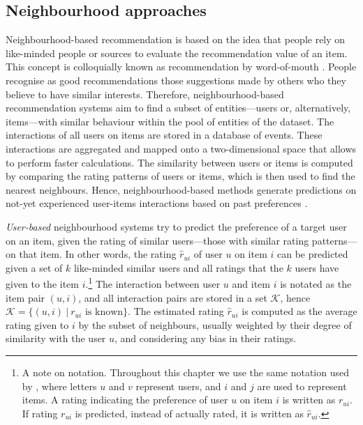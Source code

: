 

\subsection{Neighbourhood approaches}\label{sub:neighbourhood}
Neighbourhood-based recommendation is based on the idea that people rely on like-minded people or sources to evaluate the recommendation value of an item. This concept is colloquially known as recommendation by word-of-mouth \autocite{ricci15recommender}. People recognise as good recommendations those suggestions made by others who they believe to have similar interests.
Therefore, neighbourhood-based recommendation systems aim to find a subset of entities---users or, alternatively, items---with similar behaviour within the pool of entities of the dataset.
The interactions of all users on items are stored in a database of events. These interactions are aggregated and mapped onto a two-dimensional space that allows to perform faster calculations.
The similarity between users or items is computed by comparing the rating patterns of users or items, which is then used to find the nearest neighbours. Hence, neighbourhood-based methods generate predictions on not-yet experienced user-items interactions based on past preferences \autocite{herlocker99algorithmic}.


\emph{User-based} neighbourhood systems try to predict the preference of a target user on an item, given the rating of similar users---those with similar rating patterns---on that item. 
In other words, the rating ${\hat{r}}_{ui}$ of user $u$ on item $i$ can be predicted given a set of $k$ like-minded similar users and all ratings that the $k$ users have given to the item $i$.\footnote{A note on notation. Throughout this chapter we use the same notation used by \textcite{koren08factorization}, where letters $u$ and $v$ represent users, and $i$ and $j$ are used to represent items. A rating indicating the preference of user $u$ on item $i$ is written as $r_{ui}$. If rating $r_{ui}$ is predicted, instead of actually rated, it is written as ${\hat{r}}_{ui}$.}
The interaction between user $u$ and item $i$ is notated as the item pair $(u,i)$, and all interaction pairs are stored in a set $\mathcal{K}$, hence $\mathcal{K} = \{(u,i)\ |\ r_{ui} \textrm{ is known} \}$. 
The estimated rating ${\hat{r}}_{ui}$ is computed as the average rating given to $i$ by the subset of neighbours, usually weighted by their degree of similarity with the user $u$, and considering any bias in their ratings.

